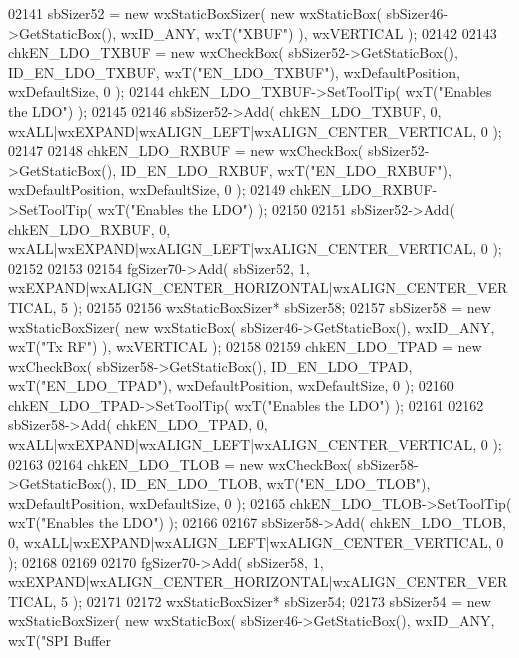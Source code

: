 \begin{DoxyCode}
02141     sbSizer52 = \textcolor{keyword}{new} wxStaticBoxSizer( \textcolor{keyword}{new} wxStaticBox( sbSizer46->GetStaticBox(), wxID\_ANY, wxT(\textcolor{stringliteral}{"XBUF"}) ), 
      wxVERTICAL );
02142     
02143     chkEN_LDO_TXBUF = \textcolor{keyword}{new} wxCheckBox( sbSizer52->GetStaticBox(), ID_EN_LDO_TXBUF, wxT(\textcolor{stringliteral}{"EN\_LDO\_TXBUF"}), 
      wxDefaultPosition, wxDefaultSize, 0 );
02144     chkEN_LDO_TXBUF->SetToolTip( wxT(\textcolor{stringliteral}{"Enables the LDO"}) );
02145     
02146     sbSizer52->Add( chkEN_LDO_TXBUF, 0, wxALL|wxEXPAND|wxALIGN\_LEFT|wxALIGN\_CENTER\_VERTICAL, 0 );
02147     
02148     chkEN_LDO_RXBUF = \textcolor{keyword}{new} wxCheckBox( sbSizer52->GetStaticBox(), ID_EN_LDO_RXBUF, wxT(\textcolor{stringliteral}{"EN\_LDO\_RXBUF"}), 
      wxDefaultPosition, wxDefaultSize, 0 );
02149     chkEN_LDO_RXBUF->SetToolTip( wxT(\textcolor{stringliteral}{"Enables the LDO"}) );
02150     
02151     sbSizer52->Add( chkEN_LDO_RXBUF, 0, wxALL|wxEXPAND|wxALIGN\_LEFT|wxALIGN\_CENTER\_VERTICAL, 0 );
02152     
02153     
02154     fgSizer70->Add( sbSizer52, 1, wxEXPAND|wxALIGN\_CENTER\_HORIZONTAL|wxALIGN\_CENTER\_VERTICAL, 5 );
02155     
02156     wxStaticBoxSizer* sbSizer58;
02157     sbSizer58 = \textcolor{keyword}{new} wxStaticBoxSizer( \textcolor{keyword}{new} wxStaticBox( sbSizer46->GetStaticBox(), wxID\_ANY, wxT(\textcolor{stringliteral}{"Tx RF"}) ),
       wxVERTICAL );
02158     
02159     chkEN_LDO_TPAD = \textcolor{keyword}{new} wxCheckBox( sbSizer58->GetStaticBox(), ID_EN_LDO_TPAD, wxT(\textcolor{stringliteral}{"EN\_LDO\_TPAD"}), 
      wxDefaultPosition, wxDefaultSize, 0 );
02160     chkEN_LDO_TPAD->SetToolTip( wxT(\textcolor{stringliteral}{"Enables the LDO"}) );
02161     
02162     sbSizer58->Add( chkEN_LDO_TPAD, 0, wxALL|wxEXPAND|wxALIGN\_LEFT|wxALIGN\_CENTER\_VERTICAL, 0 );
02163     
02164     chkEN_LDO_TLOB = \textcolor{keyword}{new} wxCheckBox( sbSizer58->GetStaticBox(), ID_EN_LDO_TLOB, wxT(\textcolor{stringliteral}{"EN\_LDO\_TLOB"}), 
      wxDefaultPosition, wxDefaultSize, 0 );
02165     chkEN_LDO_TLOB->SetToolTip( wxT(\textcolor{stringliteral}{"Enables the LDO"}) );
02166     
02167     sbSizer58->Add( chkEN_LDO_TLOB, 0, wxALL|wxEXPAND|wxALIGN\_LEFT|wxALIGN\_CENTER\_VERTICAL, 0 );
02168     
02169     
02170     fgSizer70->Add( sbSizer58, 1, wxEXPAND|wxALIGN\_CENTER\_HORIZONTAL|wxALIGN\_CENTER\_VERTICAL, 5 );
02171     
02172     wxStaticBoxSizer* sbSizer54;
02173     sbSizer54 = \textcolor{keyword}{new} wxStaticBoxSizer( \textcolor{keyword}{new} wxStaticBox( sbSizer46->GetStaticBox(), wxID\_ANY, wxT(\textcolor{stringliteral}{"SPI Buffer
}
\end{DoxyCode}
